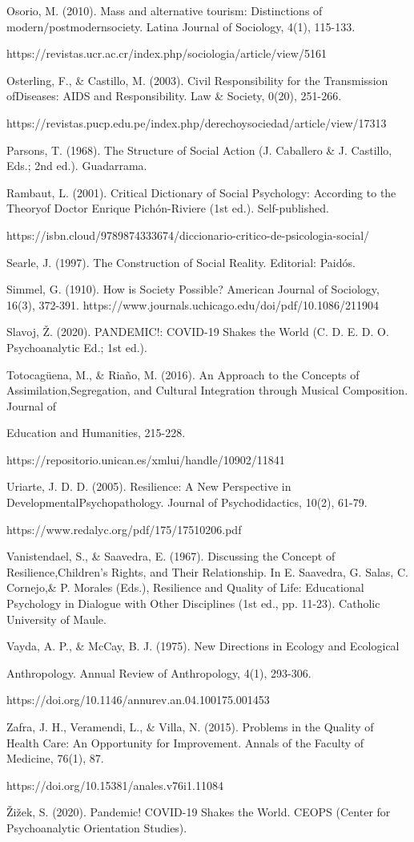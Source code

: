 \documentclass{article}
\begin{document}
Osorio, M. (2010). Mass and alternative tourism: Distinctions of modern/postmodernsociety. Latina Journal of Sociology, 4(1), 115-133.

https://revistas.ucr.ac.cr/index.php/sociologia/article/view/5161

Osterling, F., \& Castillo, M. (2003). Civil Responsibility for the Transmission ofDiseases: AIDS and Responsibility. Law \& Society, 0(20), 251-266.

https://revistas.pucp.edu.pe/index.php/derechoysociedad/article/view/17313

Parsons, T. (1968). The Structure of Social Action (J. Caballero \& J. Castillo, Eds.; 2nd ed.). Guadarrama.

Rambaut, L. (2001). Critical Dictionary of Social Psychology: According to the Theoryof Doctor Enrique Pichón-Riviere (1st ed.). Self-published.

https://isbn.cloud/9789874333674/diccionario-critico-de-psicologia-social/

Searle, J. (1997). The Construction of Social Reality. Editorial: Paidós.

Simmel, G. (1910). How is Society Possible? American Journal of Sociology, 16(3), 372-391. https://www.journals.uchicago.edu/doi/pdf/10.1086/211904

Slavoj, Ž. (2020). PANDEMIC!: COVID-19 Shakes the World (C. D. E. D. O. Psychoanalytic Ed.; 1st ed.).

Totocagüena, M., \& Riaño, M. (2016). An Approach to the Concepts of Assimilation,Segregation, and Cultural Integration through Musical Composition. Journal of

Education and Humanities, 215-228.

https://repositorio.unican.es/xmlui/handle/10902/11841

Uriarte, J. D. D. (2005). Resilience: A New Perspective in DevelopmentalPsychopathology. Journal of Psychodidactics, 10(2), 61-79.

https://www.redalyc.org/pdf/175/17510206.pdf

Vanistendael, S., \& Saavedra, E. (1967). Discussing the Concept of Resilience,Children's Rights, and Their Relationship. In E. Saavedra, G. Salas, C. Cornejo,\& P. Morales (Eds.), Resilience and Quality of Life: Educational Psychology in Dialogue with Other Disciplines (1st ed., pp. 11-23). Catholic University of Maule.

Vayda, A. P., \& McCay, B. J. (1975). New Directions in Ecology and Ecological

Anthropology. Annual Review of Anthropology, 4(1), 293-306.

https://doi.org/10.1146/annurev.an.04.100175.001453

Zafra, J. H., Veramendi, L., \& Villa, N. (2015). Problems in the Quality of Health Care: An Opportunity for Improvement. Annals of the Faculty of Medicine, 76(1), 87.

https://doi.org/10.15381/anales.v76i1.11084

Žižek, S. (2020). Pandemic! COVID-19 Shakes the World. CEOPS (Center for Psychoanalytic Orientation Studies).
\end{document}

